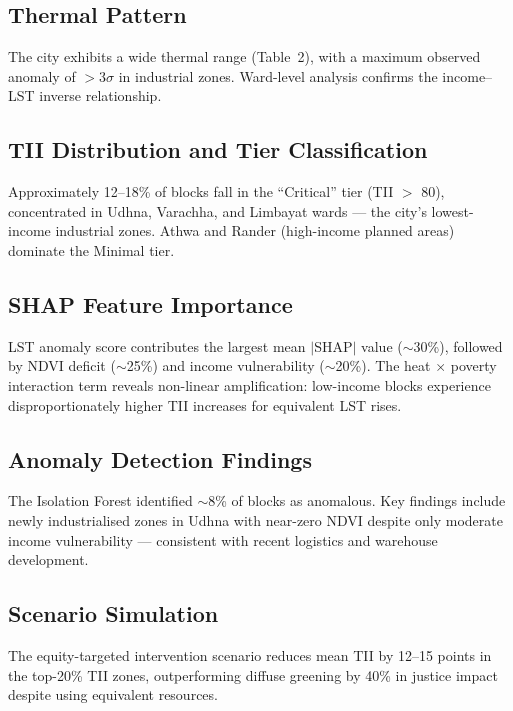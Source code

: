 \documentclass[12pt, a4paper]{article}
\begin{document}
\subsection{Thermal Pattern}

The city exhibits a wide thermal range (Table~2), with a maximum observed
anomaly of $>3\sigma$ in industrial zones. Ward-level analysis confirms
the income--LST inverse relationship.

\subsection{TII Distribution and Tier Classification}

Approximately 12--18\% of blocks fall in the ``Critical'' tier (TII $>$ 80),
concentrated in Udhna, Varachha, and Limbayat wards — the city's lowest-income
industrial zones. Athwa and Rander (high-income planned areas) dominate the
Minimal tier.

\subsection{SHAP Feature Importance}

LST anomaly score contributes the largest mean $|$SHAP$|$ value ($\sim$30\%),
followed by NDVI deficit ($\sim$25\%) and income vulnerability ($\sim$20\%).
The heat $\times$ poverty interaction term reveals non-linear amplification:
low-income blocks experience disproportionately higher TII increases for
equivalent LST rises.

\subsection{Anomaly Detection Findings}

The Isolation Forest identified $\sim$8\% of blocks as anomalous. Key findings
include newly industrialised zones in Udhna with near-zero NDVI despite
only moderate income vulnerability — consistent with recent logistics and
warehouse development.

\subsection{Scenario Simulation}

The equity-targeted intervention scenario reduces mean TII by 12--15 points
in the top-20\% TII zones, outperforming diffuse greening by 40\% in justice
impact despite using equivalent resources.
\end{document}
